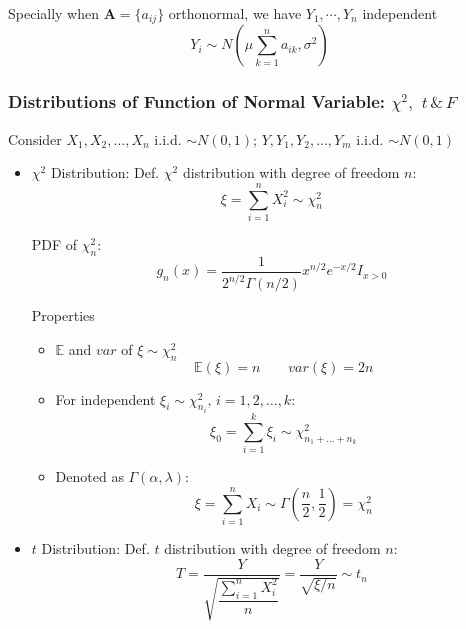     Specially when 
    $\bm{A}=\{a_{ij}\}$ orthonormal, we have $Y_1,\cdots,Y_n$ independent
    \begin{equation}
        Y_i\sim N(\mu\sum_{k=1}^n a_{ik},\sigma^2)    
    \end{equation}

    \subsubsection{Distributions of Function of Normal Variable: $\chi^2,$ $t\,\& \,F$}\label{chi2_t_F_properties}
        Consider $X_1,X_2,\ldots,X_n$ i.i.d. $\sim N(0,1)$; $Y,Y_1,Y_2,\ldots,Y_m$ i.i.d. $\sim N(0,1)$
        \begin{itemize}
            \item $\chi^2$ Distribution: Def. $\chi^2$ distribution with degree of freedom $n$:
            \begin{equation}        
                \xi =\sum_{i=1}^n X_i^2\sim \chi^2_n
            \end{equation}

            PDF of $\chi^2_n$:
            \begin{equation}        
                g_n(x)=\dfrac{1}{2^{n/2}\Gamma(n/2)}x^{n/2}e^{-x/2}I_{x>0}  
            \end{equation}

            Properties
            \begin{itemize}
                \item $\mathbb{E}$ and $var$ of $\xi\sim\chi^2_n$
                \begin{equation}            \mathbb{E}(\xi)=n\qquad var(\xi)=2n\end{equation}
                \item For independent $\xi_i\sim\chi^2_{n_i},\, i=1,2,\ldots,k$:\begin{equation}            
                    \xi_0=\sum_{i=1}^k\xi_i\sim\chi^2_{n_1+\ldots+n_k}\end{equation}
                \item Denoted as $\Gamma(\alpha,\lambda)$: \begin{equation}            \xi=\sum_{i=1}^nX_i\sim\Gamma(\frac{n}{2},\frac{1}{2})=\chi^2_n\end{equation}
            \end{itemize}
            \item $t$ Distribution: Def. $t$ distribution with degree of freedom $n$:
            \begin{equation}        
                T=\frac{Y}{\sqrt{\dfrac{\sum_{i=1}^nX_i^2}{n}}}=\frac{Y}{\sqrt{\xi \big/ n}}\sim t_n
            \end{equation}


\end{itemize}
